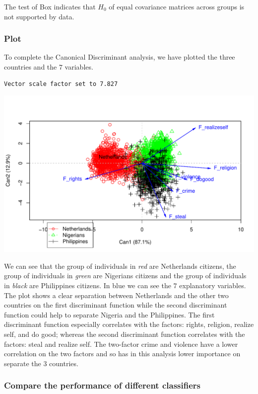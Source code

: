 \documentclass[
  11pt,
]{article}
\begin{document}
The test of Box indicates that \(H_{0}\) of equal covariance matrices across groups is not supported by data.

\newpage

\hypertarget{plot}{%
\subsubsection{Plot}\label{plot}}

To complete the Canonical Discriminant analysis, we have plotted the three countries and the \(7\) variables.

\begin{verbatim}
Vector scale factor set to 7.827
\end{verbatim}

\includegraphics{report_files/figure-latex/Task_1_4-1.pdf}

We can see that the group of individuals in \emph{red} are Netherlands citizens, the group of individuals in \emph{green} are Nigerians citizens and the group of individuals in \emph{black} are Philippines citizens. In blue we can see the \(7\) explanatory variables. The plot shows a clear separation between Netherlands and the other two countries on the first discriminant function while the second discriminant function could help to separate Nigeria and the Philippines.
The first discriminant function especially correlates with the factors: rights, religion, realize self, and do good; whereas the second discriminant function correlates with the factors: steal and realize self. The two-factor crime and violence have a lower correlation on the two factors and so has in this analysis lower importance on separate the \(3\) countries.

\hypertarget{compare-the-performance-of-different-classifiers}{%
\subsubsection{Compare the performance of different classifiers}\label{compare-the-performance-of-different-classifiers}}
\end{document}
